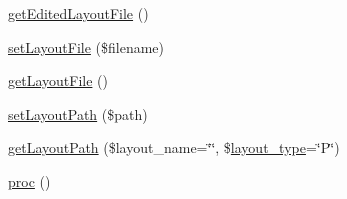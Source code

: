 \begin{DoxyCompactItemize}
\item 
\hyperlink{classModuleObject_a14fc83257a1518a1753c50cb11289c27}{get\+Edited\+Layout\+File} ()
\item 
\hyperlink{classModuleObject_aab99465b1bac81df148c829a3b14f933}{set\+Layout\+File} (\$filename)
\item 
\hyperlink{classModuleObject_af446ac0f9c2a19c2629f30afd6271ec6}{get\+Layout\+File} ()
\item 
\hyperlink{classModuleObject_a15410a43eadf4aa49e4fed4b26cd1f25}{set\+Layout\+Path} (\$path)
\item 
\hyperlink{classModuleObject_ad3f6b56ddff1e52a49015771d0a08336}{get\+Layout\+Path} (\$layout\+\_\+name=\char`\"{}\char`\"{}, \$\hyperlink{ko_8install_8php_a0532d89570cfdaebc628afac2ff5a81b}{layout\+\_\+type}=\char`\"{}P\char`\"{})
\item 
\hyperlink{classModuleObject_a621ea29505c6ccd4444a06bc1c8554a5}{proc} ()
\end{DoxyCompactItemize}
